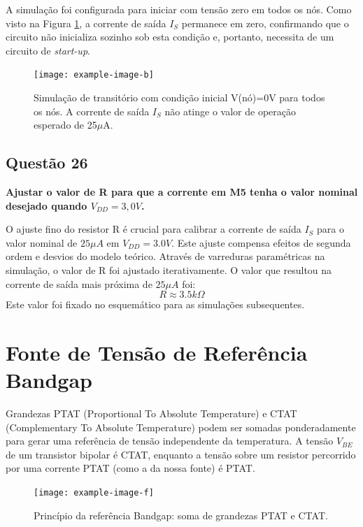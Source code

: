 ﻿\documentclass[12pt,a4paper]{article}
\begin{document}
A simulação foi configurada para iniciar com tensão zero em todos os nós. Como visto na Figura \ref{fig:startup_fail}, a corrente de saída $I_S$ permanece em zero, confirmando que o circuito não inicializa sozinho sob esta condição e, portanto, necessita de um circuito de \textit{start-up}.

\begin{figure}[H]
\centering
\texttt{[image: example-image-b]}
\caption{Simulação de transitório com condição inicial V(nó)=0V para todos os nós. A corrente de saída $I_S$ não atinge o valor de operação esperado de 25$\mu$A.}
\label{fig:startup_fail}
\end{figure}


\subsection*{Questão 26}

\textbf{Ajustar o valor de R para que a corrente em M5 tenha o valor nominal desejado quando $V_{DD} = 3,0V$.}

O ajuste fino do resistor R é crucial para calibrar a corrente de saída $I_S$ para o valor nominal de $25\mu A$ em $V_{DD} = 3.0V$. Este ajuste compensa efeitos de segunda ordem e desvios do modelo teórico. Através de varreduras paramétricas na simulação, o valor de R foi ajustado iterativamente. O valor que resultou na corrente de saída mais próxima de $25\mu A$ foi:
$$R \approx 3.5k\Omega$$
Este valor foi fixado no esquemático para as simulações subsequentes.

\section*{Fonte de Tensão de Referência Bandgap}

Grandezas PTAT (Proportional To Absolute Temperature) e CTAT (Complementary To Absolute Temperature) podem ser somadas ponderadamente para gerar uma referência de tensão independente da temperatura. A tensão $V_{BE}$ de um transistor bipolar é CTAT, enquanto a tensão sobre um resistor percorrido por uma corrente PTAT (como a da nossa fonte) é PTAT.

\begin{figure}[H]
\centering
\texttt{[image: example-image-f]}
\caption{Princípio da referência Bandgap: soma de grandezas PTAT e CTAT.}
\label{fig:bandgap_principle}
\end{figure}
\end{document}

